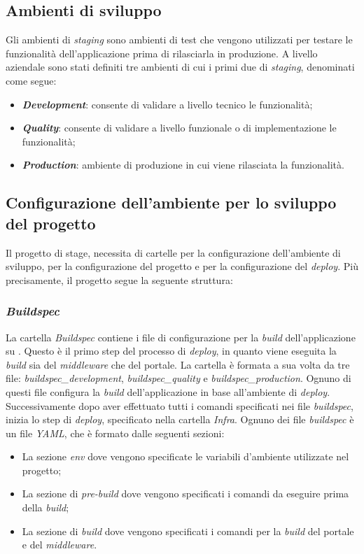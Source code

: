 \subsection{Ambienti di sviluppo}\label{subsec:ambienti-sviluppo}
Gli ambienti di \textit{staging} sono ambienti di test che vengono utilizzati per testare le funzionalità dell'applicazione prima di rilasciarla in produzione.
A livello aziendale sono stati definiti tre ambienti di cui i primi due di \textit{staging}, denominati come segue:
\begin{itemize}
  \item \textbf{\textit{Development}}: consente di validare a livello tecnico le funzionalità;
  \item \textbf{\textit{Quality}}: consente di validare a livello funzionale o di implementazione le funzionalità;
  \item \textbf{\textit{Production}}: ambiente di produzione in cui viene rilasciata la funzionalità.
\end{itemize}

\subsection{Configurazione dell'ambiente per lo sviluppo del progetto}\label{subsec:configurazione-ambiente-sviluppo}
Il progetto di stage, necessita di cartelle per la configurazione dell'ambiente di sviluppo, per la configurazione del progetto e per la configurazione del \textit{deploy}.
Più precisamente, il progetto segue la seguente struttura:

\subsubsection*{\emph{Buildspec}}\label{subsubsec:buildspec}
La cartella \textit{Buildspec} contiene i file di configurazione per la \textit{build} dell'applicazione su .
Questo è il primo step del processo di \textit{deploy}, in quanto viene eseguita la \textit{build} sia del \textit{middleware} che del portale.
La cartella è formata a sua volta da tre file: \textit{buildspec\_development}, \textit{buildspec\_quality} e \textit{buildspec\_production}. 
Ognuno di questi file configura la \textit{build} dell'applicazione in base all'ambiente di \textit{deploy}.\\
Successivamente dopo aver effettuato tutti i comandi specificati nei file \textit{buildspec}, inizia lo step di \textit{deploy}, specificato nella cartella \textit{Infra}.
Ognuno dei file \textit{buildspec} è un file \textit{YAML}, che è formato dalle seguenti sezioni:
\begin{itemize}
  \item La sezione \textit{env} dove vengono specificate le variabili d'ambiente utilizzate nel progetto;
  \item La sezione di \textit{pre-build} dove vengono specificati i comandi da eseguire prima della \textit{build};
  \item La sezione di \textit{build} dove vengono specificati i comandi per la \textit{build} del portale e del \textit{middleware}.
\end{itemize}

